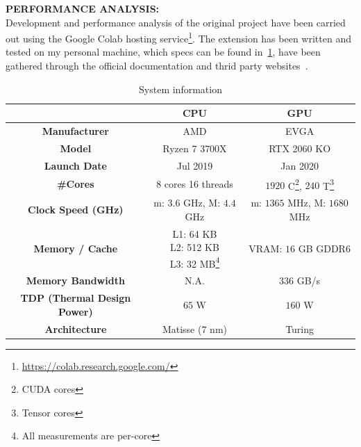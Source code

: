 \documentclass[a4paper,10pt]{article}
\begin{document}
\bigskip
{}
\makeatletter{}\makeatother\label{sec:performance-analysis}
\noindent
\textbf{PERFORMANCE ANALYSIS:}
\\
Development and performance analysis of the original project have been carried out using the Google
Colab hosting service\footnote{\url{https://colab.research.google.com/}}. The extension has been
written and tested on my personal machine, which specs can be found in~\ref{tbl:system}, have been
gathered through the official documentation and thrid party
websites~\cite{rtx-2060-powerup, rtx-2060-evga, r7-3700x}.
\begin{center}
	\begin{longtable}{|c|c|c|}
		\caption{System information}\label{tbl:system}
		\\\hline\textbf{} & \textbf{CPU} & \textbf{GPU} \\\hline\hline
		\endfirsthead\hline\endlastfoot

		\textbf{Manufacturer}               & AMD                        & EVGA                                                                \\\hline

		\textbf{Model}                      & Ryzen 7 3700X              & RTX 2060 KO                                                         \\\hline
		\textbf{Launch Date}                & Jul 2019                   & Jan 2020                                                            \\\hline
		\textbf{\#Cores}                    & $8$ cores 16 threads       & $\num{1920}$ C\footnote{CUDA cores}, $240$ T\footnote{Tensor cores} \\\hline
		\textbf{Clock Speed (GHz)}          & m: $3.6$ GHz, M: $4.4$ GHz & m: $1365$ MHz, M: $1680$ MHz                                        \\\hline
		\textbf{Memory / Cache}             & \makecell{L1: 64 KB                                                                              \\ L2: 512 KB \\ L3: 32 MB\footnote{All measurements are per-core}} & VRAM: $16$ GB GDDR6                                                 \\\hline
		\textbf{Memory Bandwidth}           & N.A.                       & 336 GB/s                                                            \\\hline
		\textbf{TDP (Thermal Design Power)} & $65$ W                     & $160$ W                                                             \\\hline
		\textbf{Architecture}               & Matisse ($7$ nm)           & Turing
	\end{longtable}
\end{center}
\end{document}
